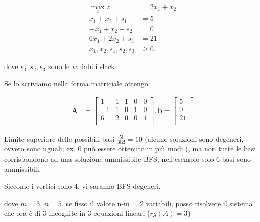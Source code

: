 \documentclass[a4paper, 11pt]{article}
\begin{document}
            \begin{align*}
                \max_{x} z &= 2x_1 + x_2 \\
                x_1 + x_2 + s_1 &= 5 \\
                -x_1 + x_2 + s_2 &= 0 \\
                6x_1 + 2x_2 + s_3 &= 21 \\
                x_1, x_2, s_1, s_2, s_3 &\geq 0.
            \end{align*}



            dove $s_1, s_2, s_3$ sono le variabili slack
            
            


            Se lo scriviamo nella forma matriciale ottengo:


            \begin{align*}
                \mathbf{A} &= 
                \begin{bmatrix}
                1 & 1 & 1 & 0 & 0 \\
                -1 & 1 & 0 & 1 & 0 \\
                6 & 2 & 0 & 0 & 1 \\
                \end{bmatrix},
                \mathbf{b} = 
                    \begin{bmatrix}
                        5 \\
                        0 \\
                        21 \\
                    \end{bmatrix}
                \end{align*}

               

                Limite superiore delle possibili basi $\frac{5!}{3!2!} = 10$ (alcune soluzioni sono degeneri, ovvero sono uguali; ex. 0 può essere ottenuto in più modi.), ma non tutte le basi corrispondono ad una soluzione ammissibile BFS, nell’esempio solo 6 basi sono ammissibili.

                Siccome i vertici sono 4, vi saranno BFS degeneri.

                dove $m = 3$, $n = 5$. 
                se fisso il valore n-m = 2 variabili, posso risolvere il sistema che ora è  di 3 incognite in 3 equazioni lineari ($rg(A) = 3$)
                
\end{document}

